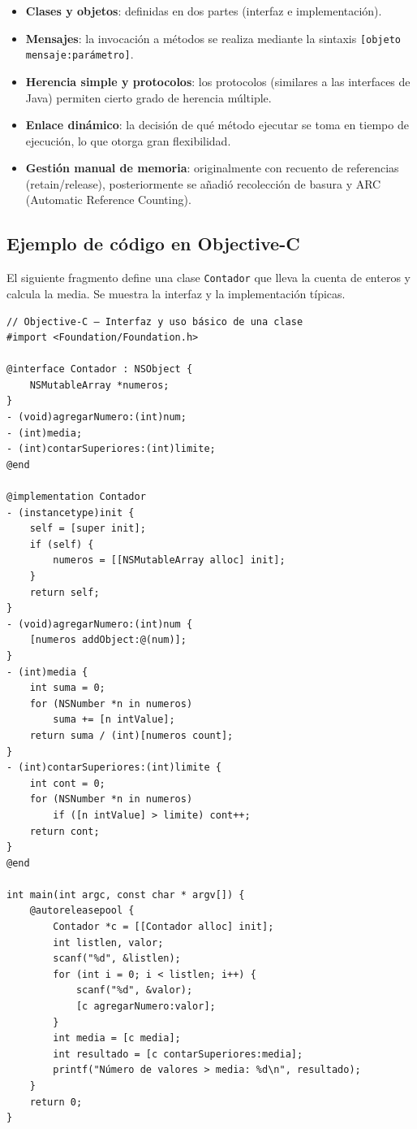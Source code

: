 \begin{itemize}
  \item \textbf{Clases y objetos}: definidas en dos partes (interfaz e implementación).
  \item \textbf{Mensajes}: la invocación a métodos se realiza mediante la sintaxis \texttt{[objeto mensaje:parámetro]}.
  \item \textbf{Herencia simple y protocolos}: los protocolos (similares a las interfaces de Java) permiten cierto grado de herencia múltiple.
  \item \textbf{Enlace dinámico}: la decisión de qué método ejecutar se toma en tiempo de ejecución, lo que otorga gran flexibilidad.
  \item \textbf{Gestión manual de memoria}: originalmente con recuento de referencias (retain/release), posteriormente se añadió recolección de basura y ARC (Automatic Reference Counting).
\end{itemize}

\subsection{Ejemplo de código en Objective-C}

El siguiente fragmento define una clase \texttt{Contador} que lleva la cuenta de enteros y calcula la media. Se muestra la interfaz y la implementación típicas.

\begin{verbatim}
// Objective-C – Interfaz y uso básico de una clase
#import <Foundation/Foundation.h>

@interface Contador : NSObject {
    NSMutableArray *numeros;
}
- (void)agregarNumero:(int)num;
- (int)media;
- (int)contarSuperiores:(int)limite;
@end

@implementation Contador
- (instancetype)init {
    self = [super init];
    if (self) {
        numeros = [[NSMutableArray alloc] init];
    }
    return self;
}
- (void)agregarNumero:(int)num {
    [numeros addObject:@(num)];
}
- (int)media {
    int suma = 0;
    for (NSNumber *n in numeros)
        suma += [n intValue];
    return suma / (int)[numeros count];
}
- (int)contarSuperiores:(int)limite {
    int cont = 0;
    for (NSNumber *n in numeros)
        if ([n intValue] > limite) cont++;
    return cont;
}
@end

int main(int argc, const char * argv[]) {
    @autoreleasepool {
        Contador *c = [[Contador alloc] init];
        int listlen, valor;
        scanf("%d", &listlen);
        for (int i = 0; i < listlen; i++) {
            scanf("%d", &valor);
            [c agregarNumero:valor];
        }
        int media = [c media];
        int resultado = [c contarSuperiores:media];
        printf("Número de valores > media: %d\n", resultado);
    }
    return 0;
}
\end{verbatim}

